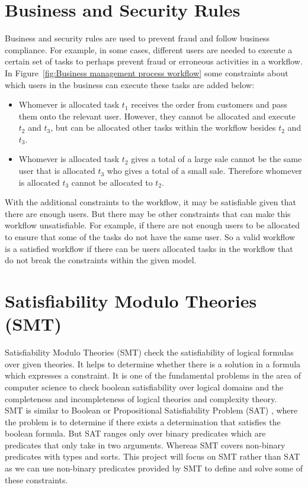 \documentclass[a4paper]{report}
\begin{document}
\section{Business and Security Rules}
Business and security rules are used to prevent fraud and follow business compliance. For example, in some cases, different users are needed to execute a certain set of tasks to perhaps prevent fraud or erroneous activities in a workflow. In Figure~\ref{fig:Business management process workflow} some constraints about which users in the business can execute these tasks are added below:
\begin{itemize}
\item Whomever is allocated task $t_{1}$ receives the order from customers and pass them onto the relevant user. However, they cannot be allocated and execute $t_{2}$ and $t_{3}$, but can be allocated other tasks within the workflow besides $t_{2}$ and $t_{3}$.
\item Whomever is allocated task $t_{2}$ gives a total of a large sale cannot be the same user that is allocated $t_{3}$ who gives a total of a small sale. Therefore whomever is allocated $t_{3}$ cannot be allocated to $t_{2}$.
\end{itemize}

With the additional constraints to the workflow, it may be satisfiable given that there are enough users. But there may be other constraints that can make this workflow unsatisfiable. For example, if there are not enough users to be allocated to ensure that some of the tasks do not have the same user. So a valid workflow is a satisfied workflow if there can be users allocated tasks in the workflow that do not break the constraints within the given model.\\

\section{Satisfiability Modulo Theories (SMT)}
Satisfiability Modulo Theories (SMT)\cite{smt_appetizer} check the satisfiability of logical formulas over given theories. It helps to determine whether there is a solution in a formula which expresses a constraint. It is one of the fundamental problems in the area of computer science to check boolean satisfiability over logical domains and the completeness and incompleteness of logical theories and complexity theory. \\

SMT is similar to Boolean or Propositional Satisfiability Problem (SAT)\cite{sat} , where the problem is to determine if there exists a determination that satisfies the boolean formula. But SAT ranges only over binary predicates which are predicates that only take in two arguments. Whereas SMT covers non-binary predicates with types and sorts. This project will focus on SMT rather than SAT as we can use non-binary predicates provided by SMT to define and solve some of these constraints. \\
\end{document}
